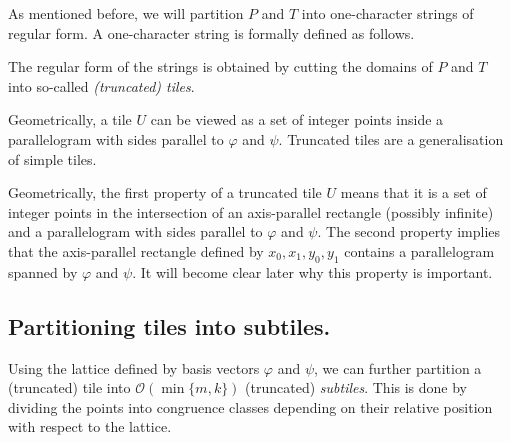 \documentclass[a4paper,11pt]{article}
\renewcommand{\O}{\mathcal{O}}
\renewcommand{\phi}{\varphi}
\newcommand{\jonas}[2][]{\todo[color=green!40, #1]{\textbf{J:} #2}}
\begin{document}
As mentioned before, we will partition $P$ and $T$ into one-character strings of regular form. A one-character string is formally defined as follows.

\restateDefMonochromaticString

The regular form of the strings is obtained by cutting the domains of $P$ and $T$ into so-called \emph{(truncated) tiles}.

\restateDefTile

Geometrically, a tile $U$ can be viewed as a set of integer points inside a parallelogram with sides parallel to $\phi$ and $\psi$. Truncated tiles are a generalisation of simple tiles. 

\restateDefTruncatedTile

Geometrically, the first property of a truncated tile $U$ means that it is a set of integer points in the intersection of an axis-parallel rectangle (possibly infinite) and a parallelogram with sides parallel to $\phi$ and $\psi$. The second property implies that the axis-parallel rectangle defined by $x_0, x_1, y_0, y_1$ contains a parallelogram spanned by $\phi$ and $\psi$. It will become clear later why this property is important. 

\subsection*{Partitioning tiles into subtiles.}

Using the lattice defined by basis vectors $\phi$ and $\psi$, we can further partition a (truncated) tile into $\O(\min\{m, k\})$ (truncated) \emph{subtiles}. This is done by dividing the points into congruence classes depending on their relative position with respect to the lattice.

\restateDefLatticeCongruency
\end{document}
